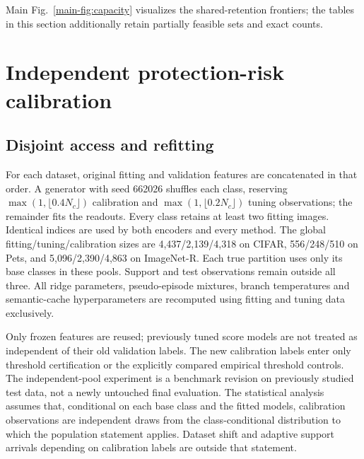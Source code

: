 \documentclass[preprint,review,12pt]{elsarticle}
\begin{document}
\FloatBarrier
Main Fig.~\ref{main-fig:capacity} visualizes the shared-retention frontiers; the tables in this section additionally retain partially feasible sets and exact counts.
\FloatBarrier
\section{Independent protection-risk calibration}
\label{app:independentrisk}
\subsection{Disjoint access and refitting}
For each dataset, original fitting and validation features are concatenated in that order. A generator with seed 662026 shuffles each class, reserving $\max(1,\lfloor0.4N_c\rfloor)$ calibration and $\max(1,\lfloor0.2N_c\rfloor)$ tuning observations; the remainder fits the readouts. Every class retains at least two fitting images. Identical indices are used by both encoders and every method. The global fitting/tuning/calibration sizes are 4,437/2,139/4,318 on CIFAR, 556/248/510 on Pets, and 5,096/2,390/4,863 on ImageNet-R. Each true partition uses only its base classes in these pools. Support and test observations remain outside all three. All ridge parameters, pseudo-episode mixtures, branch temperatures and semantic-cache hyperparameters are recomputed using fitting and tuning data exclusively.

Only frozen features are reused; previously tuned score models are not treated as independent of their old validation labels. The new calibration labels enter only threshold certification or the explicitly compared empirical threshold controls. The independent-pool experiment is a benchmark revision on previously studied test data, not a newly untouched final evaluation. The statistical analysis assumes that, conditional on each base class and the fitted models, calibration observations are independent draws from the class-conditional distribution to which the population statement applies. Dataset shift and adaptive support arrivals depending on calibration labels are outside that statement.
\end{document}
